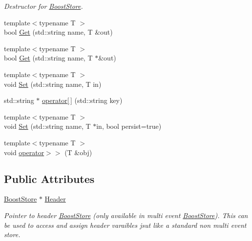 \begin{DoxyCompactItemize}
\begin{DoxyCompactList}\small\item\em Destructor for \hyperlink{classBoostStore}{Boost\-Store}. \end{DoxyCompactList}\item 
{\footnotesize template$<$typename T $>$ }\\bool \hyperlink{classBoostStore_aaf269e40778672ed68224377b5e90fa9}{Get} (std\-::string name, T \&out)
\item 
{\footnotesize template$<$typename T $>$ }\\bool \hyperlink{classBoostStore_a7e2496fd31eed43a84eea9563ecf7f86}{Get} (std\-::string name, T $\ast$\&out)
\item 
{\footnotesize template$<$typename T $>$ }\\void \hyperlink{classBoostStore_a94e4f0b1d996488538efc09b831cd1a6}{Set} (std\-::string name, T in)
\item 
std\-::string $\ast$ \hyperlink{classBoostStore_aca2c7aed9a33e4022bb18c887d9dc42c}{operator\mbox{[}$\,$\mbox{]}} (std\-::string key)
\item 
{\footnotesize template$<$typename T $>$ }\\void \hyperlink{classBoostStore_a198a7f41e16912b439b85523f802ad0f}{Set} (std\-::string name, T $\ast$in, bool persist=true)
\item 
{\footnotesize template$<$typename T $>$ }\\void \hyperlink{classBoostStore_a4f1bce161785c396eb407adf3ab4491e}{operator$>$$>$} (T \&obj)
\end{DoxyCompactItemize}
\subsection*{Public Attributes}
\begin{DoxyCompactItemize}
\item 
\hypertarget{classBoostStore_a4f76becb874456bcdf04d6a84a48bcbb}{\hyperlink{classBoostStore}{Boost\-Store} $\ast$ \hyperlink{classBoostStore_a4f76becb874456bcdf04d6a84a48bcbb}{Header}}\label{classBoostStore_a4f76becb874456bcdf04d6a84a48bcbb}

\begin{DoxyCompactList}\small\item\em Pointer to header \hyperlink{classBoostStore}{Boost\-Store} (only available in multi event \hyperlink{classBoostStore}{Boost\-Store}). This can be used to access and assign header varaibles jsut like a standard non multi event store. \end{DoxyCompactList}\end{DoxyCompactItemize}
